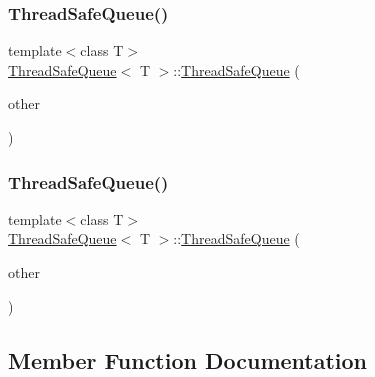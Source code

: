 \subsubsection{\texorpdfstring{Thread\+Safe\+Queue()}{ThreadSafeQueue()}\hspace{0.1cm}{\footnotesize\ttfamily [2/3]}}
{\footnotesize\ttfamily template$<$class T$>$ \\
\hyperlink{class_thread_safe_queue}{Thread\+Safe\+Queue}$<$ T $>$\+::\hyperlink{class_thread_safe_queue}{Thread\+Safe\+Queue} (\begin{DoxyParamCaption}\item[{const \hyperlink{class_thread_safe_queue}{Thread\+Safe\+Queue}$<$ T $>$ \&}]{other }\end{DoxyParamCaption})\hspace{0.3cm}{\ttfamily [delete]}}

\mbox{\label{class_thread_safe_queue_a51c1e1c4eb980e2cb5d3012de447bbd5}} 
\subsubsection{\texorpdfstring{Thread\+Safe\+Queue()}{ThreadSafeQueue()}\hspace{0.1cm}{\footnotesize\ttfamily [3/3]}}
{\footnotesize\ttfamily template$<$class T$>$ \\
\hyperlink{class_thread_safe_queue}{Thread\+Safe\+Queue}$<$ T $>$\+::\hyperlink{class_thread_safe_queue}{Thread\+Safe\+Queue} (\begin{DoxyParamCaption}\item[{const \hyperlink{class_thread_safe_queue}{Thread\+Safe\+Queue}$<$ T $>$ \&\&}]{other }\end{DoxyParamCaption})\hspace{0.3cm}{\ttfamily [delete]}}



\subsection{Member Function Documentation}
\mbox{\label{class_thread_safe_queue_a58b5532baa6110071f697ad1f9bfbf58}} 
